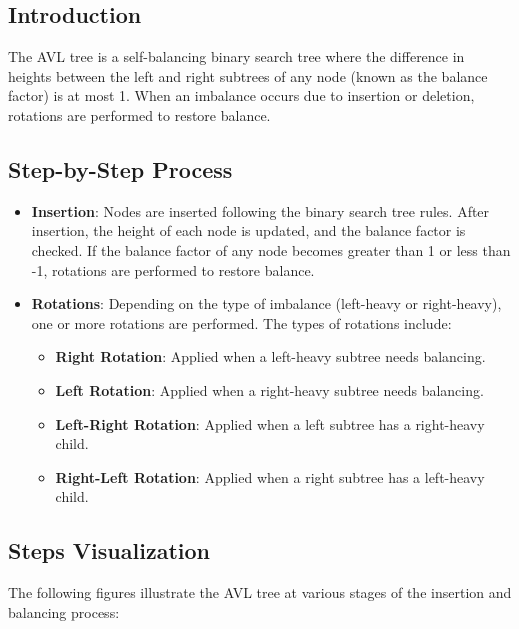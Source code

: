 \documentclass[10pt,a4paper]{article}
\begin{document}
\subsection*{Introduction}
The AVL tree is a self-balancing binary search tree where the difference in heights between the left and right subtrees of any node (known as the balance factor) is at most 1. When an imbalance occurs due to insertion or deletion, rotations are performed to restore balance.

\subsection*{Step-by-Step Process}
\begin{itemize}
    \item \textbf{Insertion}: Nodes are inserted following the binary search tree rules. After insertion, the height of each node is updated, and the balance factor is checked. If the balance factor of any node becomes greater than 1 or less than -1, rotations are performed to restore balance.
    \item \textbf{Rotations}: Depending on the type of imbalance (left-heavy or right-heavy), one or more rotations are performed. The types of rotations include:
    \begin{itemize}
        \item \textbf{Right Rotation}: Applied when a left-heavy subtree needs balancing.
        \item \textbf{Left Rotation}: Applied when a right-heavy subtree needs balancing.
        \item \textbf{Left-Right Rotation}: Applied when a left subtree has a right-heavy child.
        \item \textbf{Right-Left Rotation}: Applied when a right subtree has a left-heavy child.
    \end{itemize}
\end{itemize}

\subsection*{Steps Visualization}
The following figures illustrate the AVL tree at various stages of the insertion and balancing process:
\end{document}
